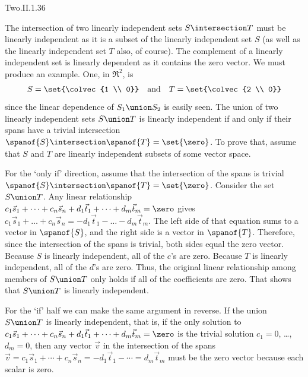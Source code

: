 \begin{ans}{Two.II.1.36}
      \begin{exparts}
        \partsitem The intersection of two linearly independent sets
          $S\intersection T$ must be linearly
          independent as it is a subset of the linearly independent set $S$
          (as well as the linearly independent set $T$ also, of course).
        \partsitem The complement of a linearly independent set is linearly
          dependent as it contains the zero vector.
        \partsitem We must produce an example.
          One, in \( \Re^2 \), is
          \begin{equation*}
            S=\set{\colvec{1 \\ 0}}
            \quad\text{and}\quad
            T=\set{\colvec{2 \\ 0}}
          \end{equation*}
          since the linear dependence of \( S_1\union S_2 \) is easily seen.
        \partsitem The union of two linearly independent sets $S\union T$
          is linearly independent if and only if their spans have a trivial
          intersection $\spanof{S}\intersection \spanof{T}=\set{\zero}$.
          To prove that, assume that \( S \) and \( T \) are linearly
          independent subsets of some vector space.

          For the `only if' direction, assume that the intersection of
          the spans is trivial
          \( \spanof{S}\intersection \spanof{T}=\set{\zero} \).
          Consider the set $S\union T$.
          Any linear relationship
          $c_1\vec{s}_1+\dots+c_n\vec{s}_n
            +d_1\vec{t}_1+\dots+d_m\vec{t}_m=\zero$
          gives
          $c_1\vec{s}_1+\dots+c_n\vec{s}_n=
            -d_1\vec{t}_1-\dots-d_m\vec{t}_m$.
          The left side of that equation sums to a vector in $\spanof{S}$, and
          the right side is a vector in $\spanof{T}$.
          Therefore, since the intersection of the spans is trivial, both
          sides equal the zero vector.
          Because $S$ is linearly independent, all of the $c$'s are zero.
          Because $T$ is linearly independent, all of the $d$'s are zero.
          Thus, the original linear relationship among members of
          $S\union T$ only holds if all of the coefficients are zero.
          That shows that $S\union T$ is linearly independent.

          For the `if' half we can make the same argument in reverse.
          If the union $S\union T$ is linearly independent, that is,
          if the only solution to
          $c_1\vec{s}_1+\cdots+c_n\vec{s}_n
            +d_1\vec{t}_1+\cdots+d_m\vec{t}_m
            =\zero$
          is the trivial solution $c_1=0$, \ldots, $d_m=0$,
          then any vector $\vec{v}$ in the intersection of the spans
          $\vec{v}=c_1\vec{s}_1+\cdots+c_n\vec{s}_n
            =-d_1\vec{t}_1-\cdots=d_m\vec{t}_m$
          must be the zero vector because each scalar is zero.
      \end{exparts}
    
\end{ans}
